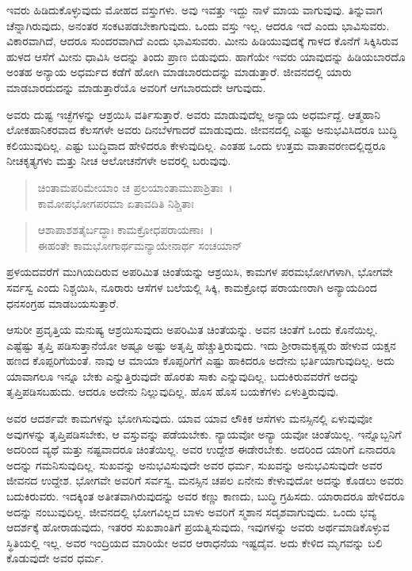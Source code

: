 ಇವರು ಹಿಡಿದುಕೊಳ್ಳುವುದು ಮೋಹದ ವಸ್ತುಗಳು. ಅವು ಇವತ್ತು ಇದ್ದು ನಾಳೆ ಮಾಯ ವಾಗುವುವು. ತಿನ್ನುವಾಗ ಚೆನ್ನಾಗಿರುವುದು, ಅನಂತರ ಸಂಕಟಪಡಬೇಕಾಗುವುದು. ಒಂದು ವಸ್ತು ಇಲ್ಲ. ಆದರೂ ಇದೆ ಎಂದು ಭಾವಿಸುವರು. ವಿಕಾರವಾಗಿದೆ, ಆದರೂ ಸುಂದರವಾಗಿದೆ ಎಂದು ಭಾವಿಸುವರು. ಮೀನು ಹಿಡಿಯುವುದಕ್ಕೆ ಗಾಳದ ಕೊನೆಗೆ ಸಿಕ್ಕಿಸಿರುವ ಹುಳದ ಆಸೆಗೆ ಮೀನು ಧಾವಿಸಿ ಅದನ್ನು ತಿಂದು ಪ್ರಾಣ ಬಿಡುವುದು. ಹಾಗೆಯೇ ಇವರು ಯಾವುದನ್ನು ಹಿಡಿಯಬಾರದೊ ಅಂತಹ ಅನ್ಯಾಯ ಅಧರ್ಮದ ಕಡೆಗೆ ಹೋಗಿ ಮಾಡಬಾರದುದನ್ನು ಮಾಡುತ್ತಾರೆ. ಜೀವನದಲ್ಲಿ ಯಾರು ಮಾಡಬಾರದುದನ್ನು ಮಾಡುತ್ತಾರೆಯೊ ಅವರಿಗೆ ಆಗಬಾರದುದೇ ಆಗುವುದು.

ಅವರು ದುಷ್ಟ ಇಚ್ಛೆಗಳನ್ನು ಆಶ್ರಯಿಸಿ ವರ್ತಿಸುತ್ತಾರೆ. ಅವರು ಮಾಡುವುದೆಲ್ಲ ಅನ್ಯಾಯ ಅಧರ್ಮದ್ದೆ. ಆತ್ಮಹಾನಿ ಲೋಕಹಾನಿಕರವಾದ ಕೆಲಸಗಳೇ ಅವರು ದಿನಬೆಳಗಾದರೆ ಮಾಡುವುದು. ಜೀವನದಲ್ಲಿ ಎಷ್ಟು ಅನುಭವಿಸಿದರೂ ಬುದ್ಧಿ ಕಲಿಯುವುದಿಲ್ಲ. ಎಷ್ಟು ಬುದ್ಧಿವಾದ ಹೇಳಿದರೂ ಕೇಳುವುದಿಲ್ಲ. ಎಂತಹ ಒಂದು ಉತ್ತಮ ವಾತಾವರಣದಲ್ಲಿದ್ದರೂ ನೀಚಕೃತ್ಯಗಳು ಮತ್ತು ನೀಚ ಆಲೋಚನೆಗಳೇ ಅವರಲ್ಲಿ ಬರುವುವು.

\begin{verse}
ಚಿಂತಾಮಪರಿಮೇಯಾಂ ಚ ಪ್ರಲಯಾಂತಾಮುಪಾಶ್ರಿತಾಃ~।\\ಕಾಮೋಪಭೋಗಪರಮಾ ಏತಾವದಿತಿ ನಿಶ್ಚಿತಾಃ 
\end{verse}

\begin{verse}
ಆಶಾಪಾಶಶತೈರ್ಬದ್ಧಾಃ ಕಾಮಕ್ರೋಧಪರಾಯಣಾಃ~।\\ಈಹಂತೇ ಕಾಮಭೋಗಾರ್ಥಮನ್ಯಾಯೇನಾರ್ಥ ಸಂಚಯಾನ್ 
\end{verse}

{\small ಪ್ರಳಯದವರೆಗೆ ಮುಗಿಯದಿರುವ ಅಪರಿಮಿತ ಚಿಂತೆಯನ್ನು ಆಶ್ರಯಿಸಿ, ಕಾಮಗಳ ಪರಮಭೋಗಿಗಳಾಗಿ, ಭೋಗವೇ ಸರ್ವಸ್ವ ಎಂದು ನಿಶ್ಚಯಿಸಿ, ನೂರಾರು ಆಸೆಗಳ ಬಲೆಯಲ್ಲಿ ಸಿಕ್ಕಿ, ಕಾಮಕ್ರೋಧ ಪರಾಯಣರಾಗಿ ಅನ್ಯಾಯದಿಂದ ಧನಸಂಗ್ರಹ ಮಾಡಬಯಸುತ್ತಾರೆ.}

ಆಸುರೀ ಪ್ರವೃತ್ತಿಯ ಮನುಷ್ಯ ಆಶ್ರಯಿಸುವುದು ಅಪರಿಮಿತ ಚಿಂತೆಯನ್ನು. ಅವನ ಚಿಂತೆಗೆ ಒಂದು ಕೊನೆಯಿಲ್ಲ. ಎಷ್ಟೆಷ್ಟು ತೃಪ್ತಿ ಪಡಿಸುತ್ತಾನೆಯೋ ಅಷ್ಟೂ ಅಷ್ಟು ಅತೃಪ್ತಿ ಹೆಚ್ಚುತ್ತಿರುವುದು. ಇದು ಶ‍್ರೀರಾಮಕೃಷ್ಣರು ಹೇಳುವ ಯಕ್ಷನ ಹಣದ ಕೊಪ್ಪರಿಗೆಯಂತೆ. ನಾವು ಆ ಮಾಯಾ ಕೊಪ್ಪರಿಗೆಗೆ ಎಷ್ಟು ಹಾಕಿದರೂ ಅದೇನು ಭರ್ತಿಯಾಗುವುದಿಲ್ಲ. ಅದು ಯಾವಾಗಲೂ ಇನ್ನೂ ಬೇಕು ಎನ್ನುತ್ತಿರುವುದೇ ಹೊರತು ಸಾಕು ಎನ್ನುವುದಿಲ್ಲ. ಬದುಕಿರುವವರೆಗೆ ಅದನ್ನು ತೃಪ್ತಿಪಡಿಸಬಹುದು. ಆದರೂ ಅದೇನು ನಿಲ್ಲುವುದಿಲ್ಲ. ಹೊಸ ಹೊಸ ಬಯಕೆಗಳು ಏಳುತ್ತಿರುವುವು.

ಅವರ ಆದರ್ಶವೇ ಕಾಮಗಳನ್ನು ಭೋಗಿಸುವುದು. ಯಾವ ಯಾವ ಲೌಕಿಕ ಆಸೆಗಳು ಮನಸ್ಸಿನಲ್ಲಿ ಏಳುವುವೋ ಅವುಗಳನ್ನು ತೃಪ್ತಿಪಡಿಸಬೇಕು, ಆ ವಸ್ತುವನ್ನು ಪಡೆಯಬೇಕು. ನ್ಯಾಯವೋ ಅನ್ಯಾ ಯವೋ ಚಿಂತೆಯಿಲ್ಲ. ಇನ್ನೊಬ್ಬನಿಗೆ ಅದರಿಂದ ವ್ಯಥೆ ಮತ್ತು ನಷ್ಟವಾದರೂ ಚಿಂತೆಯಿಲ್ಲ. ಅವರ ಉದ್ದೇಶ ಈಡೇರಬೇಕು. ಅದರಿಂದ ಯಾರಿಗೆ ಏನಾದರೂ ಅದನ್ನು ಗಮನಿಸುವುದಿಲ್ಲ. ಸುಖವನ್ನು ಅನುಭವಿಸುವುದೇ ಅವರ ಧರ್ಮ, ಸುಖವನ್ನು ಅನುಭವಿಸುವುದೇ ಅವರ ಜೀವನದ ಉದ್ದೇಶ. ಭೋಗವೇ ಅವರಿಗೆ ಸರ್ವಸ್ವ. ಮನಸ್ಸಿನ ಚಪಲ ಏನೇನು ಕೇಳುವುದೋ ಅದನ್ನು ಕೊಡಲು ಅವರು ಬದುಕಿರುವರು. ಇದಕ್ಕಿಂತ ಅತೀತವಾಗಿರುವುದನ್ನು ಅವರ ಕಣ್ಣು ಕಾಣದು, ಬುದ್ಧಿ ಗ್ರಹಿಸದು. ಯಾರಾದರೂ ಹೇಳಿದರೂ ಅದನ್ನು ನಂಬುವುದಿಲ್ಲ. ಜೀವನದಲ್ಲಿ ಭೋಗವಿಲ್ಲದ ಬಾಳು ಅವರಿಗೆ ಸ್ಮಶಾನ ಸದೃಶವಾಗುವುದು. ಒಂದು ಭವ್ಯ ಆದರ್ಶಕ್ಕೆ ಹೋರಾಡುವುದು, ಇತರರ ಸುಖಶಾಂತಿಗೆ ಪ್ರಯತ್ನಿಸುವುದು, ಇವುಗಳನ್ನು ಅವರು ಅರ್ಥಮಾಡಿಕೊಳ್ಳುವ ಸ್ಥಿತಿಯಲ್ಲಿ ಇಲ್ಲ. ಅವರ ಇಂದ್ರಿಯದ ಮಾರಿಯೇ ಅವರ ಆರಾಧನೆಯ ಇಷ್ಟದೈವ. ಅದು ಕೇಳಿದ ಮೃಗವನ್ನು ಬಲಿ ಕೊಡುವುದೇ ಅವರ ಧರ್ಮ. 

